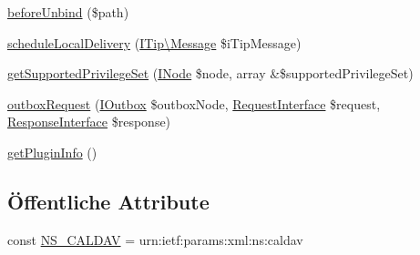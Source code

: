 \begin{DoxyCompactItemize}
\item 
\mbox{\hyperlink{class_sabre_1_1_cal_d_a_v_1_1_schedule_1_1_plugin_a2d167261595f6f62b5a18e101add2864}{before\+Unbind}} (\$path)
\item 
\mbox{\hyperlink{class_sabre_1_1_cal_d_a_v_1_1_schedule_1_1_plugin_a5895771cd02595f96b3fdf34c6361405}{schedule\+Local\+Delivery}} (\mbox{\hyperlink{class_sabre_1_1_v_object_1_1_i_tip_1_1_message}{I\+Tip\textbackslash{}\+Message}} \$i\+Tip\+Message)
\item 
\mbox{\hyperlink{class_sabre_1_1_cal_d_a_v_1_1_schedule_1_1_plugin_a53619a8ea2e41bde39e7cee8a7feacf5}{get\+Supported\+Privilege\+Set}} (\mbox{\hyperlink{interface_sabre_1_1_d_a_v_1_1_i_node}{I\+Node}} \$node, array \&\$supported\+Privilege\+Set)
\item 
\mbox{\hyperlink{class_sabre_1_1_cal_d_a_v_1_1_schedule_1_1_plugin_acea7407a5d626c516e545cfdfe8f8116}{outbox\+Request}} (\mbox{\hyperlink{interface_sabre_1_1_cal_d_a_v_1_1_schedule_1_1_i_outbox}{I\+Outbox}} \$outbox\+Node, \mbox{\hyperlink{interface_sabre_1_1_h_t_t_p_1_1_request_interface}{Request\+Interface}} \$request, \mbox{\hyperlink{interface_sabre_1_1_h_t_t_p_1_1_response_interface}{Response\+Interface}} \$response)
\item 
\mbox{\hyperlink{class_sabre_1_1_cal_d_a_v_1_1_schedule_1_1_plugin_a989aba96689cf98bcb97f71fa5eb5bf3}{get\+Plugin\+Info}} ()
\end{DoxyCompactItemize}
\subsection*{Öffentliche Attribute}
\begin{DoxyCompactItemize}
\item 
const \mbox{\hyperlink{class_sabre_1_1_cal_d_a_v_1_1_schedule_1_1_plugin_a67bcc1749b22aef8e6e4506f26e00976}{N\+S\+\_\+\+C\+A\+L\+D\+AV}} = \textquotesingle{}urn\+:ietf\+:params\+:xml\+:ns\+:caldav\textquotesingle{}
\end{DoxyCompactItemize}
